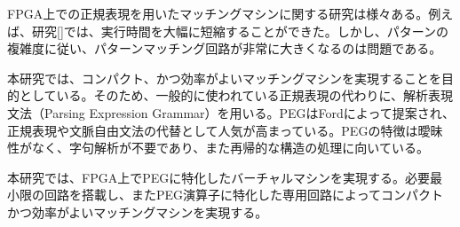 \documentclass[submit]{ipsj}
\begin{document}
FPGA上での正規表現を用いたマッチングマシンに関する研究は様々ある。例えば、研究[]では、実行時間を大幅に短縮することができた。しかし、パターンの複雑度に従い、パターンマッチング回路が非常に大きくなるのは問題である。

本研究では、コンパクト、かつ効率がよいマッチングマシンを実現することを目的としている。そのため、一般的に使われている正規表現の代わりに、解析表現文法（Parsing Expression Grammar）を用いる。PEGはFordによって提案され、正規表現や文脈自由文法の代替として人気が高まっている。PEGの特徴は曖昧性がなく、字句解析が不要であり、また再帰的な構造の処理に向いている。

本研究では、FPGA上でPEGに特化したバーチャルマシンを実現する。必要最小限の回路を搭載し、またPEG演算子に特化した専用回路によってコンパクトかつ効率がよいマッチングマシンを実現する。




\end{document}
